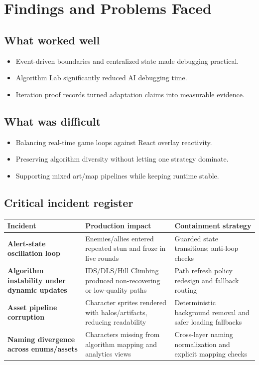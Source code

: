 \documentclass[11pt,a4paper,twoside]{article}
\begin{document}
\section{Findings and Problems Faced}
\label{sec:findings}

\subsection{What worked well}
\begin{itemize}[leftmargin=6mm]
  \item Event-driven boundaries and centralized state made debugging practical.
  \item Algorithm Lab significantly reduced AI debugging time.
  \item Iteration proof records turned adaptation claims into measurable evidence.
\end{itemize}

\subsection{What was difficult}
\begin{itemize}[leftmargin=6mm]
  \item Balancing real-time game loops against React overlay reactivity.
  \item Preserving algorithm diversity without letting one strategy dominate.
  \item Supporting mixed art/map pipelines while keeping runtime stable.
\end{itemize}

\subsection{Critical incident register}
\begin{center}
\begin{tabular}{>{\bfseries}p{3.0cm} p{5.0cm} p{4.0cm}}
\toprule
Incident & Production impact & Containment strategy \\
\midrule
Alert-state oscillation loop & Enemies/allies entered repeated stun and froze in live rounds & Guarded state transitions; anti-loop checks \\
Algorithm instability under dynamic updates & IDS/DLS/Hill Climbing produced non-recovering or low-quality paths & Path refresh policy redesign and fallback routing \\
Asset pipeline corruption & Character sprites rendered with halos/artifacts, reducing readability & Deterministic background removal and safer loading fallbacks \\
Naming divergence across enums/assets & Characters missing from algorithm mapping and analytics views & Cross-layer naming normalization and explicit mapping checks \\
\bottomrule
\end{tabular}
\end{center}
\end{document}

